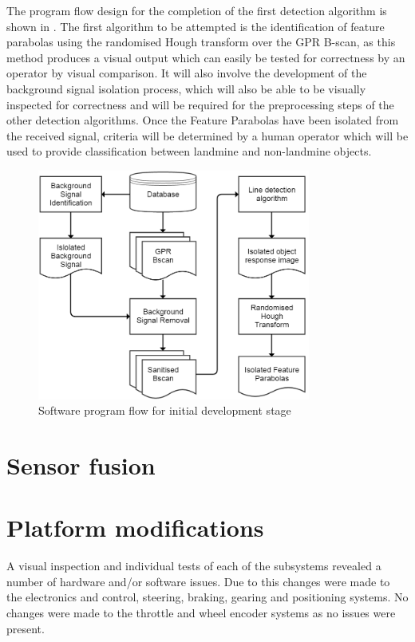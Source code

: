 \documentclass[main.tex]{subfiles}
\begin{document}
The program flow design for the completion of the first detection algorithm is shown in . The first algorithm to be attempted is the identification of feature parabolas using the randomised Hough transform over the GPR B-scan, as this method produces a visual output which can easily be tested for correctness by an operator by visual comparison. It will also involve the development of the background signal isolation process, which will also be able to be visually inspected for correctness and will be required for the preprocessing steps of the other detection algorithms.
Once the Feature Parabolas have been isolated from the received signal, criteria will be determined by a human operator which will be used to provide classification between landmine and non-landmine objects.

\begin{figure}[ht]
\includegraphics[width=0.8\textwidth]{4-DetailedDesign/agile-strategy.png}
\centering
\caption{Software program flow for initial development stage}
\end{figure}

\section{Sensor fusion}

\section{Platform modifications}
A visual inspection and individual tests of each of the subsystems revealed a number of hardware and/or software issues. Due to this changes were made to the electronics and control, steering, braking, gearing and positioning systems. No changes were made to the throttle and wheel encoder systems as no issues were present.
\end{document}
